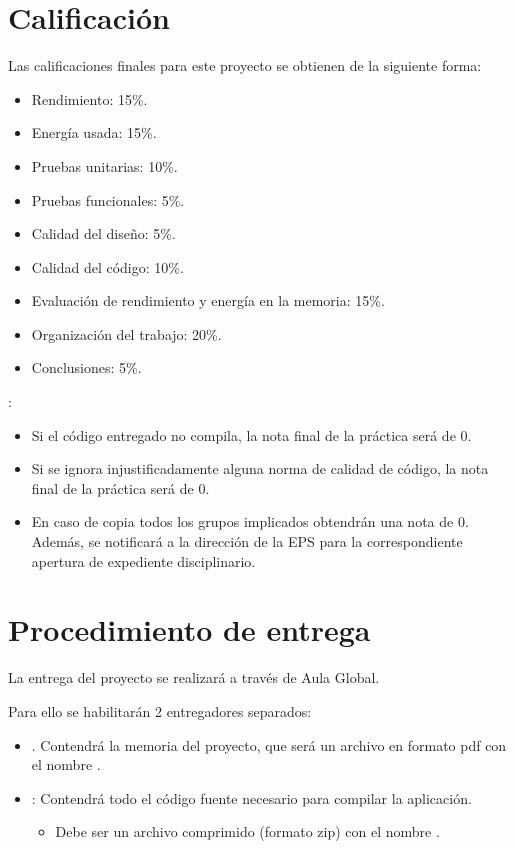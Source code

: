 \section{Calificación}

Las calificaciones finales para este proyecto se obtienen de la siguiente forma:

\begin{itemize}
  \item Rendimiento: 15\%.
  \item Energía usada: 15\%.
  \item Pruebas unitarias: 10\%.
  \item Pruebas funcionales: 5\%.
  \item Calidad del diseño: 5\%.
  \item Calidad del código: 10\%.
  \item Evaluación de rendimiento y energía en la memoria: 15\%.
  \item Organización del trabajo: 20\%.
  \item Conclusiones: 5\%.  
\end{itemize}

:

\begin{itemize}
  \item Si el código entregado no compila, la nota final de la práctica será de 0. 
  \item Si se ignora injustificadamente alguna norma de calidad de código,
        la nota final de la práctica será de 0.
  \item En caso de copia todos los grupos implicados obtendrán una nota de 0.
        Además, se notificará a la dirección de la EPS para la correspondiente
        apertura de expediente disciplinario.
\end{itemize}

\section{Procedimiento de entrega}

La entrega del proyecto se realizará a través de Aula Global.

Para ello se habilitarán 2 entregadores separados:

\begin{itemize}

\item {}. Contendrá la memoria del proyecto, que será
un archivo en formato pdf con el nombre .

\item {}: Contendrá todo el código fuente
necesario para compilar la aplicación.
\begin{itemize}
  \item Debe ser un archivo comprimido (formato zip) con el nombre
        .
\end{itemize}

\end{itemize}

